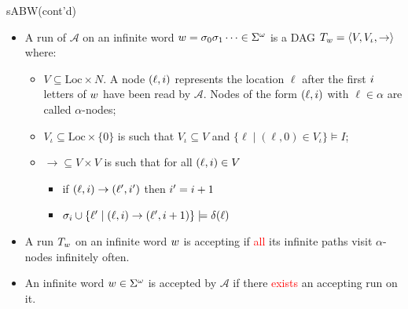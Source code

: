 \documentclass[12pt]{beamer}
\begin{document}
\begin{frame}{sABW(cont'd)}
	\begin{itemize}
		\item A run of $\mathcal{A}$ on an infinite word $\mathnormal{w} = \sigma_{0}\sigma_{1}\cdots \in \Sigma^{\omega}$ is a DAG $T_{\mathnormal{w}} = \langle V, V_{\iota}, \to \rangle$ where:
		\begin{itemize}
			\item $V \subseteq \text{Loc} \times N$. A node $(\ell, \mathnormal{i})$ represents the location $\ell$ after the first $\mathnormal{i}$ letters of $\mathnormal{w}$ have been read by $\mathcal{A}$. Nodes of the form $(\ell, \mathnormal{i})$ with 	$\ell \in \alpha$ are called $\alpha$-nodes;
			\item $V_{\iota} \subseteq \text{Loc} \times \{0\}$ is such that $V_{\iota} \subseteq V$ and $\{\ell \mid (\ell, 0) \in V_{\iota}\} \models I$;
			\item $\to \subseteq V \times V$ is such that for all $(\ell, \mathnormal{i}) \in V$
				\begin{itemize}
					\item if $(\ell, \mathnormal{i}) \to (\ell', \mathnormal{i}')$ then $\mathnormal{i}' = \mathnormal{i} + 1$
					\item $\sigma_{i} \cup \{\ell' \mid (\ell, \mathnormal{i}) \to (\ell', \mathnormal{i} + 1)\} \models \delta(\ell)$
				\end{itemize}
		\end{itemize}
		\item A run $T_{\mathnormal{w}}$ on an infinite word $\mathnormal{w}$ is accepting if \textcolor{red}{all} its infinite paths visit $\alpha$-nodes infinitely often.
		\item An infinite word $\mathnormal{w} \in \Sigma^{\omega}$ is accepted by $\mathcal{A}$ if there \textcolor{red}{exists} an accepting run on it.
	\end{itemize}
\end{frame}
\end{document}
